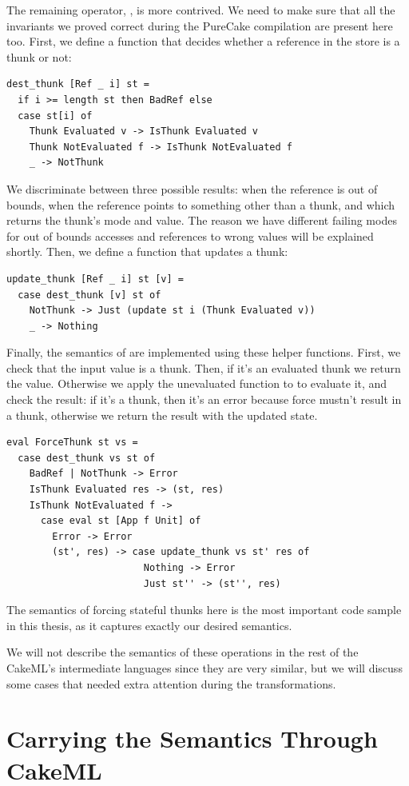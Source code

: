 The remaining operator, , is more contrived. We need to make sure
that all the invariants we proved correct during the PureCake compilation are
present here too. First, we define a function that decides whether a reference
in the store is a thunk or not:
\begin{verbatim}
dest_thunk [Ref _ i] st =
  if i >= length st then BadRef else
  case st[i] of
    Thunk Evaluated v -> IsThunk Evaluated v
    Thunk NotEvaluated f -> IsThunk NotEvaluated f
    _ -> NotThunk
\end{verbatim}
We discriminate between three possible results:  when the
reference is out of bounds,  when the reference points to
something other than a thunk, and  which returns the thunk's mode
and value. The reason we have different failing modes for out of bounds accesses
and references to wrong values will be explained shortly. Then, we define a
function that updates a thunk:
\begin{verbatim}
update_thunk [Ref _ i] st [v] =
  case dest_thunk [v] st of
    NotThunk -> Just (update st i (Thunk Evaluated v))
    _ -> Nothing
\end{verbatim}
Finally, the semantics of  are implemented using these helper
functions. First, we check that the input value is a thunk. Then, if it's an
evaluated thunk we return the value. Otherwise we apply the unevaluated function
to  to evaluate it, and check the result: if it's a thunk, then it's
an error because force mustn't result in a thunk, otherwise we return the result
with the updated state.
\begin{verbatim}
eval ForceThunk st vs =
  case dest_thunk vs st of
    BadRef | NotThunk -> Error
    IsThunk Evaluated res -> (st, res)
    IsThunk NotEvaluated f ->
      case eval st [App f Unit] of
        Error -> Error
        (st', res) -> case update_thunk vs st' res of
                        Nothing -> Error
                        Just st'' -> (st'', res)
\end{verbatim}
The semantics of forcing stateful thunks here is the most important code sample
in this thesis, as it captures exactly our desired semantics.

We will not describe the semantics of these operations in the rest of the
CakeML's intermediate languages since they are very similar, but we will discuss
some cases that needed extra attention during the transformations.

\section{Carrying the Semantics Through CakeML}

